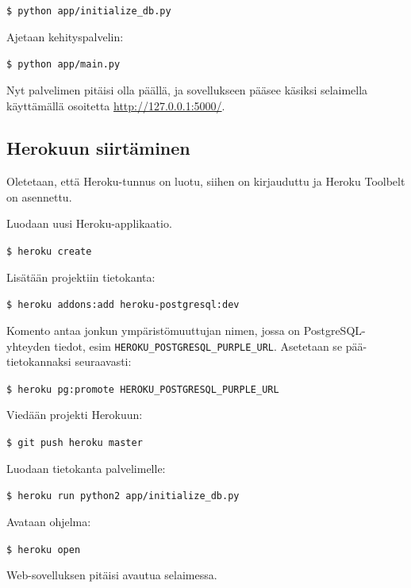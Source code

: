 \documentclass{article}
\begin{document}
\texttt{\$ python app/initialize\_db.py}

Ajetaan kehityspalvelin:

\texttt{\$ python app/main.py}

Nyt palvelimen pitäisi olla päällä, ja sovellukseen pääsee käsiksi selaimella käyttämällä osoitetta \url{http://127.0.0.1:5000/}.

\subsection{Herokuun siirtäminen}

Oletetaan, että Heroku-tunnus on luotu, siihen on kirjauduttu ja Heroku Toolbelt on asennettu.

Luodaan uusi Heroku-applikaatio.

\texttt{\$ heroku create}

Lisätään projektiin tietokanta:

\texttt{\$ heroku addons:add heroku-postgresql:dev}

Komento antaa jonkun ympäristömuuttujan nimen, jossa on PostgreSQL-yhteyden tiedot, esim \verb+HEROKU_POSTGRESQL_PURPLE_URL+. Asetetaan se pää-tietokannaksi seuraavasti:

\texttt{\$ heroku pg:promote HEROKU\_POSTGRESQL\_PURPLE\_URL}

Viedään projekti Herokuun:

\texttt{\$ git push heroku master}

Luodaan tietokanta palvelimelle:

\texttt{\$ heroku run python2 app/initialize\_db.py}

Avataan ohjelma:

\texttt{\$ heroku open}

Web-sovelluksen pitäisi avautua selaimessa.
\end{document}

